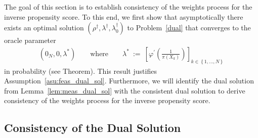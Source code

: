 The goal of this section is to establish consistency of the
weights process for the inverse propensity score.
To this end,
we first show that asymptotically there exists an optimal solution 
$
(\rho^\dagger,\lambda^\dagger,\lambda_0^\dagger)
$
to Problem~\ref{dual} that converges to the oracle parameter
\begin{align*}
  (0_N,0,\lambda^*)
  \qquad
  \text{where}
  \qquad
  \lambda^*
  \ 
  :=
  \ 
\left[ 
\varphi^{'} \left( \frac{1}{\pi(X_k)} \right)
\right]_{k\in \left\{ 1,\ldots,N \right\}}
\end{align*}
in probability (see Theorem).
This result justifies Assumption~\ref{asu:feas_dual_sol}.
Furthermore, we will identify the dual solution from Lemma~\ref{lem:meas_dual_sol} 
with the consistent dual solution to derive consistency of the weights process for the inverse propensity score.

\subsection{Consistency of the Dual Solution}
  


